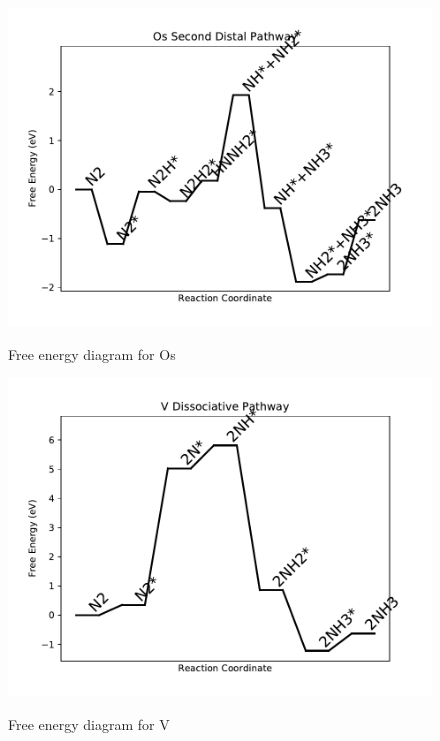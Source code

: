 \documentclass{article}
\begin{document}
\begin{figure}
\includegraphics[width=1\linewidth]{data/plots/Os_distal_2.pdf}
\label{fig:Os_distal_2}
\caption{Free energy diagram for Os}
\end{figure}

\begin{figure}
\includegraphics[width=1\linewidth]{data/plots/V_dissociative.pdf}
\label{fig:V_dissociative}
\caption{Free energy diagram for V}
\end{figure}
\end{document}
